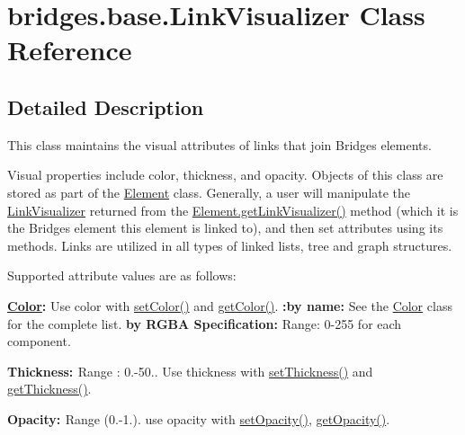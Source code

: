 \hypertarget{classbridges_1_1base_1_1_link_visualizer}{}\section{bridges.\+base.\+Link\+Visualizer Class Reference}
\label{classbridges_1_1base_1_1_link_visualizer}


\subsection{Detailed Description}
This class maintains the visual attributes of links that join Bridges elements. 

Visual properties include color, thickness, and opacity. Objects of this class are stored as part of the \mbox{\hyperlink{classbridges_1_1base_1_1_element}{Element}} class. Generally, a user will manipulate the \mbox{\hyperlink{classbridges_1_1base_1_1_link_visualizer}{Link\+Visualizer}} returned from the \mbox{\hyperlink{classbridges_1_1base_1_1_element_a7978552c7b36e28c302f611fc1958e7f}{Element.\+get\+Link\+Visualizer()}} method (which it is the Bridges element this element is linked to), and then set attributes using its methods. Links are utilized in all types of linked lists, tree and graph structures.

Supported attribute values are as follows\+:

{\bfseries{\mbox{\hyperlink{classbridges_1_1base_1_1_color}{Color}}\+:}} Use color with \mbox{\hyperlink{classbridges_1_1base_1_1_link_visualizer_a92f306dbd73b961befa8ab4c0620a89e}{set\+Color()}} and \mbox{\hyperlink{classbridges_1_1base_1_1_link_visualizer_a3ed52d98ecab99c6d8dd136fba913b7d}{get\+Color()}}. {\bfseries{\+:by name\+:}} See the \mbox{\hyperlink{classbridges_1_1base_1_1_color}{Color}} class for the complete list. {\bfseries{by R\+G\+BA Specification\+:}} Range\+: 0-\/255 for each component.

{\bfseries{ Thickness\+: }} Range \+: 0.-\/50.. Use thickness with \mbox{\hyperlink{classbridges_1_1base_1_1_link_visualizer_a702e9ca345d1a4a035baf2041f275849}{set\+Thickness()}} and \mbox{\hyperlink{classbridges_1_1base_1_1_link_visualizer_af1592d2a8664b00c1a51fdc0f8d1860a}{get\+Thickness()}}.

{\bfseries{ Opacity\+: }} Range (0.-\/1.). use opacity with \mbox{\hyperlink{classbridges_1_1base_1_1_link_visualizer_ac0d59614dbc65ed0a19c25c493a1deaa}{set\+Opacity()}}, \mbox{\hyperlink{classbridges_1_1base_1_1_link_visualizer_a07cdd435a54e4b612ad63614f2a27a4a}{get\+Opacity()}}.

